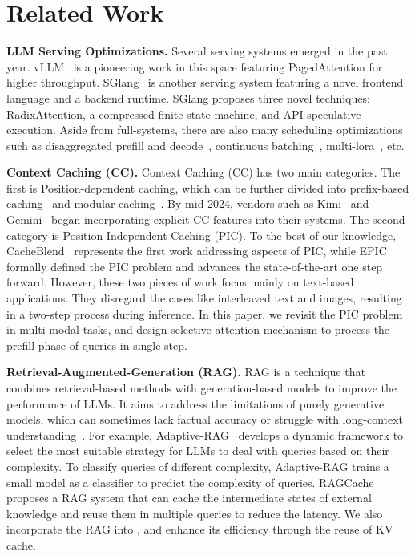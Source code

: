 \section{Related Work}


\textbf{LLM Serving Optimizations.}
%
Several serving systems emerged in the past year. vLLM~\cite{kwon2023efficient} is a pioneering work in this space featuring PagedAttention for higher throughput. 
%
SGlang~\cite{zheng2024sglang} is another serving system featuring a novel frontend language and a backend runtime. SGlang proposes three novel techniques: RadixAttention, a compressed finite state machine, and API speculative execution.
Aside from full-systems, there are also many scheduling optimizations such as disaggregated prefill and decode~\cite{zhong2024, hu2024memserve, tetriinfer-2024, patel2024}, continuous batching~\cite{yu2022}, multi-lora~\cite{sheng2023s, li2024caraserve}, etc.

\textbf{Context Caching (CC).} Context Caching (CC) has two main categories. The first is Position-dependent caching, which can be further divided into prefix-based caching~\cite{yu2023stateful-pensieve, zheng2024sglang} and modular caching~\cite{gim2024prompt}. By mid-2024, vendors such as Kimi~\cite{kimi_api} and Gemini~\cite{gemini} began incorporating explicit CC features into their systems. The second category is Position-Independent Caching (PIC). To the best of our knowledge, CacheBlend~\cite{yao2024cacheblend} represents the first work addressing aspects of PIC, while EPIC~\cite{hu2024epic} formally defined the PIC problem and advances the state-of-the-art one step forward. However, these two pieces of work focus mainly on text-based applications. They disregard the cases like interleaved text and images, resulting in a two-step process during inference. In this paper, we revisit the PIC problem in multi-modal tasks, and design selective attention mechanism to process the prefill phase of queries in single step.
 
\textbf{Retrieval-Augmented-Generation (RAG).} RAG is a technique that combines retrieval-based methods with generation-based models to improve the performance of LLMs. It aims to address the limitations of purely generative models, which can sometimes lack factual accuracy or struggle with long-context understanding~\cite{li2022survey,jin2024ragcache,gao2023retrieval,jeong2024adaptive,ram2023context,mao2020generation}. For example, Adaptive-RAG~\cite{jeong2024adaptive} develops a dynamic framework to select the most suitable strategy for LLMs to deal with queries based on their complexity. To classify queries of different complexity, Adaptive-RAG trains a small model as a classifier to predict the complexity of queries. RAGCache~\cite{jin2024ragcache} proposes a RAG system that can cache the intermediate states of external knowledge and reuse them in multiple queries to reduce the latency. We also incorporate the RAG into \sys, and enhance its efficiency through the reuse of KV cache.

